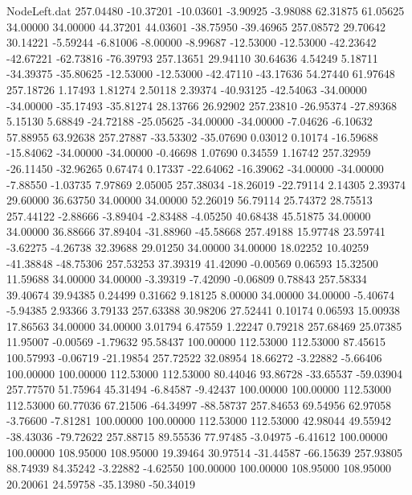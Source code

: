 \begin{filecontents}{NodeLeft.dat}
 257.04480  -10.37201  -10.03601    -3.90925   -3.98088   62.31875   61.05625   34.00000   34.00000   44.37201   44.03601  -38.75950  -39.46965
 257.08572   29.70642   30.14221    -5.59244   -6.81006   -8.00000   -8.99687  -12.53000  -12.53000  -42.23642  -42.67221  -62.73816  -76.39793
 257.13651   29.94110   30.64636     4.54249    5.18711  -34.39375  -35.80625  -12.53000  -12.53000  -42.47110  -43.17636   54.27440   61.97648
 257.18726    1.17493    1.81274     2.50118    2.39374  -40.93125  -42.54063  -34.00000  -34.00000  -35.17493  -35.81274   28.13766   26.92902
 257.23810  -26.95374  -27.89368     5.15130    5.68849  -24.72188  -25.05625  -34.00000  -34.00000   -7.04626   -6.10632   57.88955   63.92638
 257.27887  -33.53302  -35.07690     0.03012    0.10174  -16.59688  -15.84062  -34.00000  -34.00000   -0.46698    1.07690    0.34559    1.16742
 257.32959  -26.11450  -32.96265     0.67474    0.17337  -22.64062  -16.39062  -34.00000  -34.00000   -7.88550   -1.03735    7.97869    2.05005
 257.38034  -18.26019  -22.79114     2.14305    2.39374   29.60000   36.63750   34.00000   34.00000   52.26019   56.79114   25.74372   28.75513
 257.44122   -2.88666   -3.89404    -2.83488   -4.05250   40.68438   45.51875   34.00000   34.00000   36.88666   37.89404  -31.88960  -45.58668
 257.49188   15.97748   23.59741    -3.62275   -4.26738   32.39688   29.01250   34.00000   34.00000   18.02252   10.40259  -41.38848  -48.75306
 257.53253   37.39319   41.42090    -0.00569    0.06593   15.32500   11.59688   34.00000   34.00000   -3.39319   -7.42090   -0.06809    0.78843
 257.58334   39.40674   39.94385     0.24499    0.31662    9.18125    8.00000   34.00000   34.00000   -5.40674   -5.94385    2.93366    3.79133
 257.63388   30.98206   27.52441     0.10174    0.06593   15.00938   17.86563   34.00000   34.00000    3.01794    6.47559    1.22247    0.79218
 257.68469   25.07385   11.95007    -0.00569   -1.79632   95.58437  100.00000  112.53000  112.53000   87.45615  100.57993   -0.06719  -21.19854
 257.72522   32.08954   18.66272    -3.22882   -5.66406  100.00000  100.00000  112.53000  112.53000   80.44046   93.86728  -33.65537  -59.03904
 257.77570   51.75964   45.31494    -6.84587   -9.42437  100.00000  100.00000  112.53000  112.53000   60.77036   67.21506  -64.34997  -88.58737
 257.84653   69.54956   62.97058    -3.76600   -7.81281  100.00000  100.00000  112.53000  112.53000   42.98044   49.55942  -38.43036  -79.72622
 257.88715   89.55536   77.97485    -3.04975   -6.41612  100.00000  100.00000  108.95000  108.95000   19.39464   30.97514  -31.44587  -66.15639
 257.93805   88.74939   84.35242    -3.22882   -4.62550  100.00000  100.00000  108.95000  108.95000   20.20061   24.59758  -35.13980  -50.34019

\end{filecontents}
